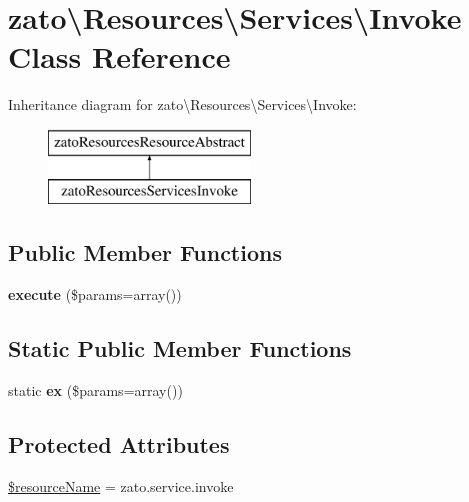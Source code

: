 \hypertarget{classzato_1_1_resources_1_1_services_1_1_invoke}{}\section{zato\textbackslash{}Resources\textbackslash{}Services\textbackslash{}Invoke Class Reference}
\label{classzato_1_1_resources_1_1_services_1_1_invoke}
Inheritance diagram for zato\textbackslash{}Resources\textbackslash{}Services\textbackslash{}Invoke\+:\begin{figure}[H]
\begin{center}
\leavevmode
\includegraphics[height=2.000000cm]{classzato_1_1_resources_1_1_services_1_1_invoke}
\end{center}
\end{figure}
\subsection*{Public Member Functions}
\begin{DoxyCompactItemize}
\item 
\hypertarget{classzato_1_1_resources_1_1_services_1_1_invoke_ad5864994c11ba455cb85fa17767d3133}{}{\bfseries execute} (\$params=array())\label{classzato_1_1_resources_1_1_services_1_1_invoke_ad5864994c11ba455cb85fa17767d3133}

\end{DoxyCompactItemize}
\subsection*{Static Public Member Functions}
\begin{DoxyCompactItemize}
\item 
\hypertarget{classzato_1_1_resources_1_1_services_1_1_invoke_ab115b6a4302042a8482ebfa2cbf26111}{}static {\bfseries ex} (\$params=array())\label{classzato_1_1_resources_1_1_services_1_1_invoke_ab115b6a4302042a8482ebfa2cbf26111}

\end{DoxyCompactItemize}
\subsection*{Protected Attributes}
\begin{DoxyCompactItemize}
\item 
\hyperlink{classzato_1_1_resources_1_1_services_1_1_invoke_a0b74d2abc0d3878703c6da02b2db6972}{\$resource\+Name} = \textquotesingle{}zato.\+service.\+invoke\textquotesingle{}
\end{DoxyCompactItemize}


